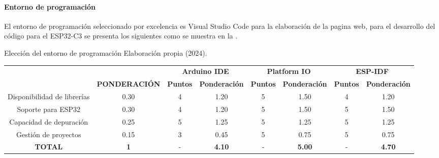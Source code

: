 \paragraph{Entorno de programación}
El entorno de programación seleccionado por excelencia es Visual Studio Code para la elaboración de la pagina web, para el desarrollo del código para el ESP32-C3 se presenta los siguientes como se muestra en la .
\begin{tabla}[ent] 
{Elección del entorno de programación}
{Elaboración propia (2024).}
\centering
\resizebox{15cm}{!}
{
\begin{tabular}{|c|c|c|c|c|c|c|c|} 
\hline
\rowcolor[rgb]{0.678,0.702,0.698} {\cellcolor[rgb]{0.678,0.702,0.698}}                                    & {\cellcolor[rgb]{0.678,0.702,0.698}}                                       & \multicolumn{2}{c|}{\textbf{Arduino IDE}} & \multicolumn{2}{c|}{\textbf{Platform IO}} & \multicolumn{2}{c|}{\textbf{ESP-IDF}}   \\
\rowcolor[rgb]{0.678,0.702,0.698} \multirow{-2}{*}{{\cellcolor[rgb]{0.678,0.702,0.698}}\textbf{CRITERIO}} & \multirow{-2}{*}{{\cellcolor[rgb]{0.678,0.702,0.698}}\textbf{PONDERACIÓN}} & \textbf{Puntos} & \textbf{Ponderación}    & \textbf{Puntos} & \textbf{Ponderación}    & \textbf{Puntos} & \textbf{Ponderación}  \\ 
\hline
\rowcolor[rgb]{0.027,0.894,0.698} Disponibilidad de librerías                                             & 0.30                                                                       & 4               & 1.20                    & 5               & 1.50                    & 4               & 1.20                  \\ 
\hline
\rowcolor[rgb]{0.027,0.894,0.675} Soporte para ESP32                                                      & 0.30                                                                       & 4               & 1.20                    & 5               & 1.50                    & 5               & 1.50                  \\ 
\hline
\rowcolor[rgb]{0.027,0.894,0.675} Capacidad de depuración                                                 & 0.25                                                                       & 5               & 1.25                    & 5               & 1.25                    & 5               & 1.25                  \\ 
\hline
Gestión de proyectos                                                                                      & 0.15                                                                       & 3               & 0.45                    & 5               & 0.75                    & 5               & 0.75                  \\ 
\hline
\textbf{TOTAL}                                                                                            & \textbf{1}                                                                 & -               & \textbf{4.10}           & -               & \textbf{5.00}           & -               & \textbf{4.70}         \\
\hline
\end{tabular}
}
\end{tabla}

